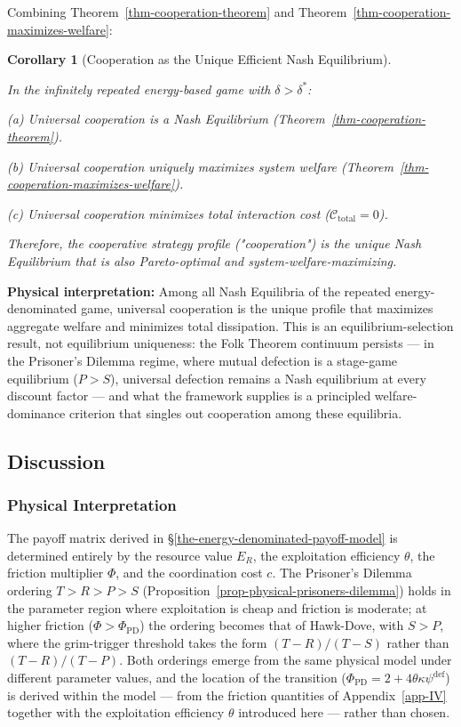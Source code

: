 \documentclass[11pt]{article}
\theoremstyle{plain}
\newtheorem{corollary}[theorem]{Corollary}
\theoremstyle{definition}
\theoremstyle{remark}
\let\origsubsection\subsection
\renewcommand{\subsection}{\needspace{7\baselineskip}\origsubsection}
\let\origsubsubsection\subsubsection
\renewcommand{\subsubsection}{\needspace{4\baselineskip}\origsubsubsection}
\begin{document}
Combining Theorem~\ref{thm-cooperation-theorem} and
Theorem~\ref{thm-cooperation-maximizes-welfare}:

\begin{corollary}[Cooperation as the Unique Efficient Nash Equilibrium]
\label{cor-cooperation-unique-efficient-ne}

In the infinitely repeated energy-based game with $\delta > \delta^*$:

(a) Universal cooperation is a Nash Equilibrium (Theorem~\ref{thm-cooperation-theorem}).

(b) Universal cooperation uniquely maximizes system welfare (Theorem~\ref{thm-cooperation-maximizes-welfare}).

(c) Universal cooperation minimizes total interaction cost ($\mathcal{C}_{\text{total}} = 0$).

Therefore, the cooperative strategy profile ("cooperation") is the unique Nash Equilibrium that is also Pareto-optimal and system-welfare-maximizing.
\end{corollary}

\textbf{Physical interpretation:} Among all Nash Equilibria of the
repeated energy-denominated game, universal cooperation is the unique
profile that maximizes aggregate welfare and minimizes total
dissipation. This is an equilibrium-selection result, not equilibrium
uniqueness: the Folk Theorem continuum persists --- in the Prisoner's
Dilemma regime, where mutual defection is a stage-game equilibrium
(\(P > S\)), universal defection remains a Nash equilibrium at every
discount factor --- and what the framework supplies is a principled
welfare-dominance criterion that singles out cooperation among these
equilibria.

\subsection{Discussion}\label{discussion-4}

\subsubsection{Physical Interpretation}\label{physical-interpretation-5}

The payoff matrix derived in §\ref{the-energy-denominated-payoff-model}
is determined entirely by the resource value \(E_R\), the exploitation
efficiency \(\theta\), the friction multiplier \(\Phi\), and the
coordination cost \(c\). The Prisoner's Dilemma ordering
\(T > R > P > S\) (Proposition~\ref{prop-physical-prisoners-dilemma})
holds in the parameter region where exploitation is cheap and friction
is moderate; at higher friction (\(\Phi > \Phi_{\text{PD}}\)) the
ordering becomes that of Hawk-Dove, with \(S > P\), where the
grim-trigger threshold takes the form \((T-R)/(T-S)\) rather than
\((T-R)/(T-P)\). Both orderings emerge from the same physical model
under different parameter values, and the location of the transition
(\(\Phi_{\text{PD}} = 2 + 4\theta\kappa\psi^{\text{def}}\)) is derived
within the model --- from the friction quantities of
Appendix~\ref{app-IV} together with the exploitation efficiency
\(\theta\) introduced here --- rather than chosen.
\end{document}
